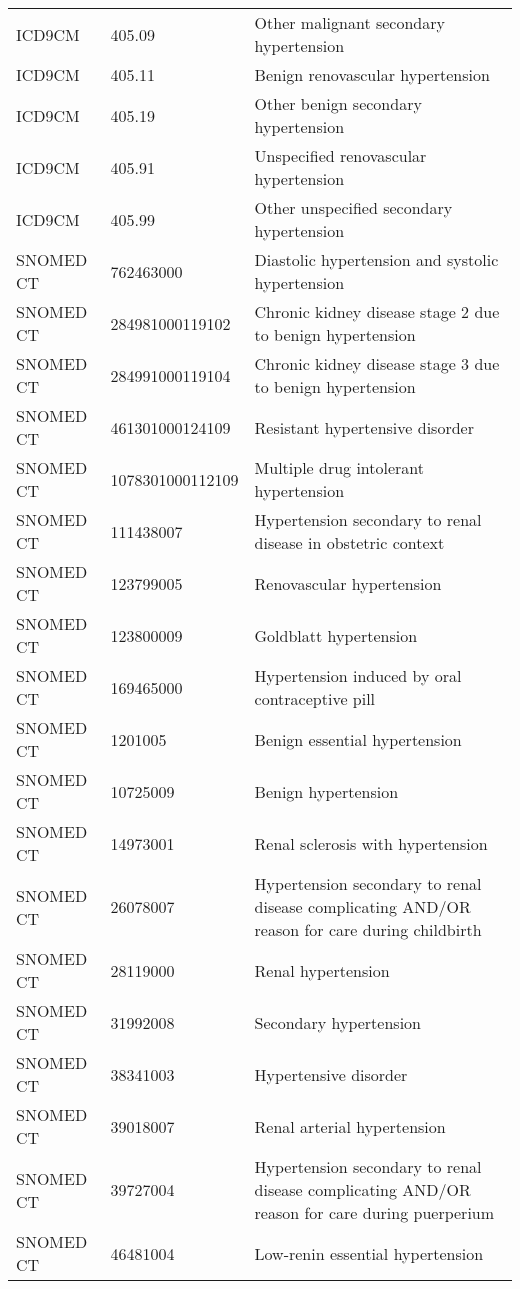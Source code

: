 \begin{longtable}{p{}p{}p{}}
  ICD9CM & 405.09 & Other malignant secondary hypertension \\ 
  ICD9CM & 405.11 & Benign renovascular hypertension \\ 
  ICD9CM & 405.19 & Other benign secondary hypertension \\ 
  ICD9CM & 405.91 & Unspecified renovascular hypertension \\ 
  ICD9CM & 405.99 & Other unspecified secondary hypertension \\ 
  SNOMED CT & 762463000 & Diastolic hypertension and systolic hypertension \\ 
  SNOMED CT & 284981000119102 & Chronic kidney disease stage 2 due to benign hypertension \\ 
  SNOMED CT & 284991000119104 & Chronic kidney disease stage 3 due to benign hypertension \\ 
  SNOMED CT & 461301000124109 & Resistant hypertensive disorder \\ 
  SNOMED CT & 1078301000112109 & Multiple drug intolerant hypertension \\ 
  SNOMED CT & 111438007 & Hypertension secondary to renal disease in obstetric context \\ 
  SNOMED CT & 123799005 & Renovascular hypertension \\ 
  SNOMED CT & 123800009 & Goldblatt hypertension \\ 
  SNOMED CT & 169465000 & Hypertension induced by oral contraceptive pill \\ 
  SNOMED CT & 1201005 & Benign essential hypertension \\ 
  SNOMED CT & 10725009 & Benign hypertension \\ 
  SNOMED CT & 14973001 & Renal sclerosis with hypertension \\ 
  SNOMED CT & 26078007 & Hypertension secondary to renal disease complicating AND/OR reason for care during childbirth \\ 
  SNOMED CT & 28119000 & Renal hypertension \\ 
  SNOMED CT & 31992008 & Secondary hypertension \\ 
  SNOMED CT & 38341003 & Hypertensive disorder \\ 
  SNOMED CT & 39018007 & Renal arterial hypertension \\ 
  SNOMED CT & 39727004 & Hypertension secondary to renal disease complicating AND/OR reason for care during puerperium \\ 
  SNOMED CT & 46481004 & Low-renin essential hypertension \\ 

\end{longtable}
